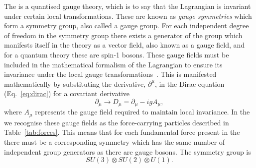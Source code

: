 The \SM is a quantised gauge theory, which is to say that the \SM Lagrangian is invariant under certain local transformations. These are known as \textit{gauge symmetries} which form a symmetry group, also called a gauge group. For each independent degree of freedom in the symmetry group there exists a generator of the group which manifests itself in the theory as a vector field, also known as a gauge field, and for a quantum theory these are spin-1 bosons. These gauge fields must be included in the mathematical formalism of the Lagrangian to ensure its invariance under the local gauge transformations~\cite{Guidry}. This is manifested mathematically by substituting the derivative, $\partial^{\mu}$, in the Dirac equation (Eq.~\ref{eq:dirac}) for a covariant derivative
\begin{equation}
  \partial_{\mu} \rightarrow D_{\mu} = \partial_{\mu}-igA_{\mu},
\end{equation}
where $A_{\mu}$ represents the gauge field required to maintain local invariance. In the \SM we recognise these gauge fields as the force-carrying particles described in Table~\ref{tab:forces}. This means that for each fundamental force present in the \SM there must be a corresponding symmetry which has the same number of independent group generators as there are gauge bosons. The \SM symmetry group is
\begin{equation}
  SU(3) \otimes SU(2) \otimes U(1).
\end{equation}

